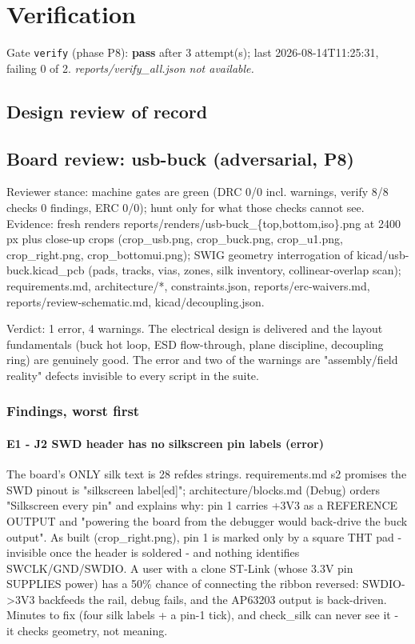 \documentclass[11pt,a4paper]{article}
\begin{document}
\section{Verification}
Gate \texttt{verify} (phase P8): \textbf{pass} after 3 attempt(s); last 2026-08-14T11:25:31, failing 0 of 2.
\emph{reports/verify\_all.json not available.}
\subsection*{Design review of record}
\subsection*{Board review: usb-buck (adversarial, P8)}
Reviewer stance: machine gates are green (DRC 0/0 incl. warnings, verify 8/8 checks 0 findings, ERC 0/0); hunt only for what those checks cannot see. Evidence: fresh renders reports/renders/usb-buck\_\{top,bottom,iso\}.png at 2400 px plus close-up crops (crop\_usb.png, crop\_buck.png, crop\_u1.png, crop\_right.png, crop\_bottomui.png); SWIG geometry interrogation of kicad/usb-buck.kicad\_pcb (pads, tracks, vias, zones, silk inventory, collinear-overlap scan); requirements.md, architecture/{*}, constraints.json, reports/erc-waivers.md, reports/review-schematic.md, kicad/decoupling.json.

Verdict: 1 error, 4 warnings. The electrical design is delivered and the layout fundamentals (buck hot loop, ESD flow-through, plane discipline, decoupling ring) are genuinely good. The error and two of the warnings are "assembly/field reality" defects invisible to every script in the suite.

\subsubsection*{Findings, worst first}
\paragraph*{E1 - J2 SWD header has no silkscreen pin labels (error)}
The board's ONLY silk text is 28 refdes strings. requirements.md s2 promises the SWD pinout is "silkscreen label{[}ed{]}"; architecture/blocks.md (Debug) orders "Silkscreen every pin" and explains why: pin 1 carries +3V3 as a REFERENCE OUTPUT and "powering the board from the debugger would back-drive the buck output". As built (crop\_right.png), pin 1 is marked only by a square THT pad - invisible once the header is soldered - and nothing identifies SWCLK/GND/SWDIO. A user with a clone ST-Link (whose 3.3V pin SUPPLIES power) has a 50\% chance of connecting the ribbon reversed: SWDIO-\textgreater{}3V3 backfeeds the rail, debug fails, and the AP63203 output is back-driven. Minutes to fix (four silk labels + a pin-1 tick), and check\_silk can never see it - it checks geometry, not meaning.
\end{document}

